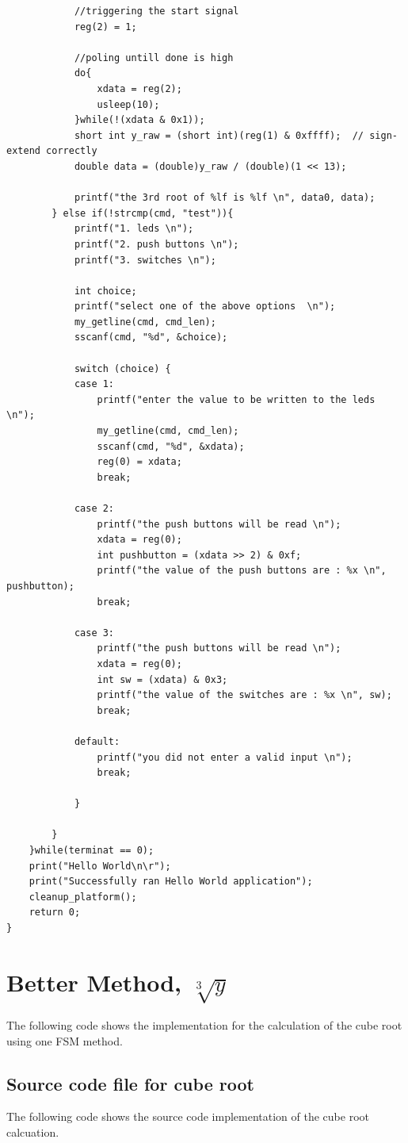\documentclass[11pt, a4paper]{report}
\begin{document}
\begin{verbatim}
    		//triggering the start signal
    		reg(2) = 1;

    		//poling untill done is high
    		do{
    			xdata = reg(2);
    			usleep(10);
    		}while(!(xdata & 0x1));
    		short int y_raw = (short int)(reg(1) & 0xffff);  // sign-extend correctly
    		double data = (double)y_raw / (double)(1 << 13);

    		printf("the 3rd root of %lf is %lf \n", data0, data);
    	} else if(!strcmp(cmd, "test")){
    		printf("1. leds \n");
    		printf("2. push buttons \n");
    		printf("3. switches \n");

    		int choice;
    		printf("select one of the above options  \n");
    		my_getline(cmd, cmd_len);
    		sscanf(cmd, "%d", &choice);

    		switch (choice) {
    		case 1:
    			printf("enter the value to be written to the leds \n");
    			my_getline(cmd, cmd_len);
    			sscanf(cmd, "%d", &xdata);
    			reg(0) = xdata;
    			break;

    		case 2:
    			printf("the push buttons will be read \n");
    			xdata = reg(0);
    			int pushbutton = (xdata >> 2) & 0xf;
    			printf("the value of the push buttons are : %x \n", pushbutton);
    			break;

    		case 3:
    			printf("the push buttons will be read \n");
				xdata = reg(0);
				int sw = (xdata) & 0x3;
				printf("the value of the switches are : %x \n", sw);
				break;

    		default:
    			printf("you did not enter a valid input \n");
    			break;

    		}

    	}
    }while(terminat == 0);
    print("Hello World\n\r");
    print("Successfully ran Hello World application");
    cleanup_platform();
    return 0;
}
\end{verbatim}

\newpage
\section{ Better Method, $\sqrt[3]{y}$}
The following code shows the implementation for the calculation of the cube root using one FSM method. 

\subsection{Source code file for cube root}
The following code shows the source code implementation of the cube root calcuation. 
\end{document}
